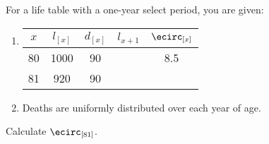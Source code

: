 For a life table with a one-year select period, you are given:
\begin{enumerate}
\item 
\begin{tabular}{|c||c|c|c|c|} \hline 
 $x$ & $l_{[x]}$ & $d_{[x]}$ & $l_{x+1}$ & $\ecirc_{[x]}$ \\ \hline
 80  & 1000    & 90     &        & 8.5 \\ \hline
 81  & 920     & 90     &        &  \\ \hline
\end{tabular}
\item Deaths are uniformly distributed over each year of age.
\end{enumerate}
Calculate $\ecirc_{[81]}$.
